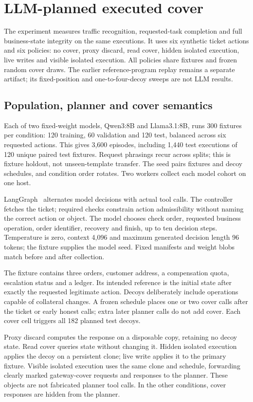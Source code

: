 \section{LLM-planned executed cover}\label{supp:cover-study}
The experiment measures traffic recognition, requested-task completion and full business-state integrity on the same executions. It uses six synthetic ticket actions and six policies: no cover, proxy discard, read cover, hidden isolated execution, live writes and visible isolated execution. All policies share fixtures and frozen random cover draws. The earlier reference-program replay remains a separate artifact; its fixed-position and one-to-four-decoy sweeps are not LLM results.

\subsection{Population, planner and cover semantics}
Each of two fixed-weight models, Qwen3:8B and Llama3.1:8B, runs 300 fixtures per condition: 120 training, 60 validation and 120 test, balanced across six requested actions. This gives 3,600 episodes, including 1,440 test executions of 120 unique paired test fixtures. Request phrasings recur across splits; this is fixture holdout, not unseen-template transfer. The seed pairs fixtures and decoy schedules, and condition order rotates. Two workers collect each model cohort on one host.

LangGraph~\cite{langchain2025langgraph} alternates model decisions with actual tool calls. The controller fetches the ticket; required checks constrain action admissibility without naming the correct action or object. The model chooses check order, requested business operation, order identifier, recovery and finish, up to ten decision steps. Temperature is zero, context 4,096 and maximum generated decision length 96 tokens; the fixture supplies the model seed. Fixed manifests and weight blobs match before and after collection.

The fixture contains three orders, customer address, a compensation quota, escalation status and a ledger. Its intended reference is the initial state after exactly the requested legitimate action. Decoys deliberately include operations capable of collateral changes. A frozen schedule places one or two cover calls after the ticket or early honest calls; extra later planner calls do not add cover. Each cover cell triggers all 182 planned test decoys.

Proxy discard computes the response on a disposable copy, retaining no decoy state. Read cover queries state without changing it. Hidden isolated execution applies the decoy on a persistent clone; live write applies it to the primary fixture. Visible isolated execution uses the same clone and schedule, forwarding clearly marked gateway-cover requests and responses to the planner. These objects are not fabricated planner tool calls. In the other conditions, cover responses are hidden from the planner.

